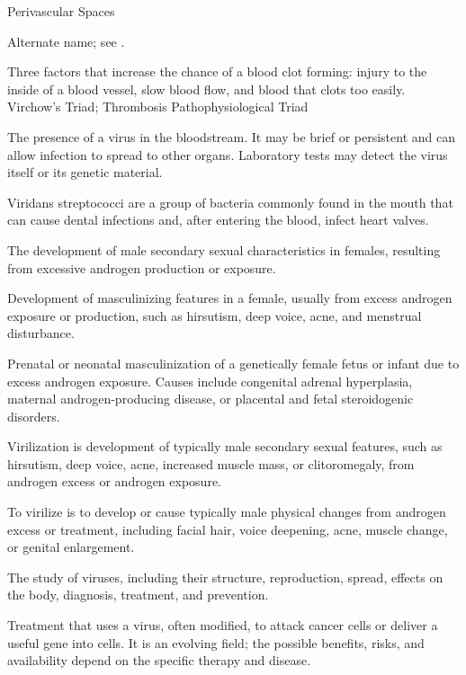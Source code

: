 \synonyms
Perivascular Spaces

 Alternate name; see .

 Three factors that increase the chance of a blood clot forming: injury to the inside of a blood vessel, slow blood flow, and blood that clots too easily.
\synonyms
Virchow's Triad; Thrombosis Pathophysiological Triad

 The presence of a virus in the bloodstream. It may be brief or persistent and can allow infection to spread to other organs. Laboratory tests may detect the virus itself or its genetic material.

 Viridans streptococci are a group of bacteria commonly found in the mouth that can cause dental infections and, after entering the blood, infect heart valves.

 The development of male secondary sexual characteristics in females, resulting from
excessive androgen production or exposure.

 Development of masculinizing features in a female, usually from excess androgen exposure or production, such as hirsutism, deep voice, acne, and menstrual disturbance.

 Prenatal or neonatal masculinization of a genetically female fetus or infant due to
excess androgen exposure. Causes include congenital adrenal hyperplasia, maternal
androgen-producing disease, or placental and fetal steroidogenic disorders.

 Virilization is development of typically male secondary sexual features, such as hirsutism, deep voice, acne, increased muscle mass, or clitoromegaly, from androgen excess or androgen exposure.

 To virilize is to develop or cause typically male physical changes from androgen excess or treatment, including facial hair, voice deepening, acne, muscle change, or genital enlargement.

 The study of viruses, including their structure, reproduction, spread, effects on the body, diagnosis, treatment, and prevention.

 Treatment that uses a virus, often modified, to attack cancer cells or deliver a useful gene into cells. It is an evolving field; the possible benefits, risks, and availability depend on the specific therapy and disease.


